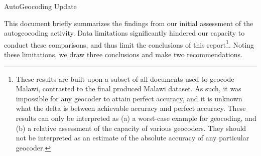 \documentclass[10pt]{article}
\begin{document}
{\LARGE AutoGeocoding Update}


This document briefly summarizes the findings from our initial assessment of the autogeocoding activity.  Data limitations significantly hindered our capacity to conduct these comparisons, and thus limit the conclusions of this report\footnote{These results are built upon a subset of all documents used to geocode Malawi, contrasted to the final produced Malawi dataset.  As such, it was impossible for any geocoder to attain perfect accuracy, and it is unknown what the delta is between achievable accuracy and perfect accuracy.  These results can only be interpreted as (a) a worst-case example for geocoding, and (b) a relative assessment of the capacity of various geocoders.  They should not be interpreted as an estimate of the absolute accuracy of any particular geocoder.}.  Noting these limitations, we draw three conclusions and make two recommendations.
\end{document}
